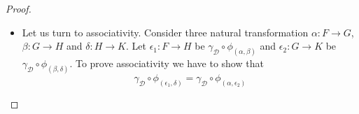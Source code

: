 \documentclass[a4paper,UKenglish,cleveref,pdftex,thm-restate,numberwithinsect]{lipics-v2021}
\def\A{\textbf {\textup{A}}}
\begin{document}
\begin{proof}
\begin{enumerate}
\begin{itemize}
\[\begin{split}
 			\\&= \gamma_{\mathcal{D}}\circ \pi_{\mathcal{D}}\circ \tau
 			\\&= \gamma_{\mathcal{D}}\circ q'_{0, \mathcal{D}}\circ \psi_{\mathcal{D}}\circ \tau
 			\\&= p_{1, \mathcal{D}}\circ \theta'_{\mathcal{D}}\circ \psi_{\mathcal{D}}\circ \tau\\ &
 			\end{split}\]
		
			We can then conclude that the two diagrams below commute.
			\[\xymatrix{A_{\mathcal{C}} \ar[r]^{\sigma}\ar[d]_{\tau} & Q_{\mathcal{D}} \ar[r]^{\psi_{\mathcal{D}}}&Q'_{\mathcal{D}} \ar[d]^{\theta'_{\mathcal{D}}} & A_{\mathcal{C}} \ar[d]_{\rho'}\ar[rr]^{\sigma} && Q_{\mathcal{D}} \ar[d]^{\theta_{\mathcal{D}}}  \\Q_{\mathcal{D}} \ar[r]_{\psi_{\mathcal{D}}}& Q'_{\mathcal{D}} \ar[r]_{\theta'_{\mathcal{D}}} & P_{\mathcal{D}} &Q'_{\mathcal{D}} \ar[r]_{\psi'_{\mathcal{D}}} & Q_{\mathcal{D}} \ar[r]_{\theta_{\mathcal{D}}}& P_{\mathcal{D}}}\]
			
			Summing up, and using , we have just proved the commutativity of all the subdiagrams of the following one. Thus the whole diagram commute and we can conclude that $\gamma_{\mathcal{D}}\circ \phi_{(\alpha, \beta)}$ is an internal natural transformation as claimed.
			
			\[\xymatrix{& P_{\mathcal{D}} \ar@/^.4cm/[ddrrr]^{\gamma_{\mathcal{D}}}\\Q_{\mathcal{D}} \ar[ur]^{\theta_{\mathcal{D}}}\ar[rr]^{\psi_{\mathcal{D}}}&&Q'_{\mathcal{D}} \ar[dr]^{\theta'_{\mathcal{D}}}\\A_{\mathcal{C}} \ar[u]_{\tau} \ar[r]^{\sigma}\ar[d]^{\rho'} \ar@/_1.5cm/[ddr]_{\phi'_{\gamma_{\mathcal{D}}\circ \phi_{(\alpha, \beta)}}}\ar@/^1.5cm/[uur]^{\phi_{\gamma_{\mathcal{D}}\circ \phi_{(\alpha, \beta)}}}& Q_{\mathcal{D}} \ar[dr]_{\theta_{\mathcal{D}}} \ar[r]^{\psi_{\mathcal{D}}}& Q'_{\mathcal{D}} \ar[r]^{\theta'_{\mathcal{D}}} & P_{\mathcal{D}} \ar[r]^{\gamma_{\mathcal{D}}} & A_{\mathcal{D}}\\ Q'_{\mathcal{D}} \ar[dr]_{\theta'_{\mathcal{D}}} \ar[r]_{\psi'_{\mathcal{D}}}& Q_{\mathcal{D}} \ar[r]_{\theta_{\mathcal{D}}} & P_{\mathcal{D}} \ar@/_.3cm/[urr]^{\gamma_{\mathcal{D}}}\\ & P_{\mathcal{D}} \ar@/_.4cm/[uurrr]_{\gamma_{\mathcal{D}}}}\]
				
				\item Let us turn to associativity. Consider three natural transformation $\alpha\colon F\to G$, $\beta\colon G\to H$ and $\delta \colon H\to K$. Let $\epsilon_1\colon F\to H$ be $\gamma_{\mathcal{D}}\circ \phi_{(\alpha, \beta)}$ and $\epsilon_2\colon G\to K$ be  $\gamma_{\mathcal{D}}\circ \phi_{(\beta, \delta)}$. To prove associativity we have to show that
				\[\gamma_{\mathcal{D}}\circ \phi_{(\epsilon_1, \delta)}=\gamma_{\mathcal{D}}\circ \phi_{(\alpha, \epsilon_2)}\]
				

\end{itemize}
\end{enumerate}
\end{proof}
\end{document}
